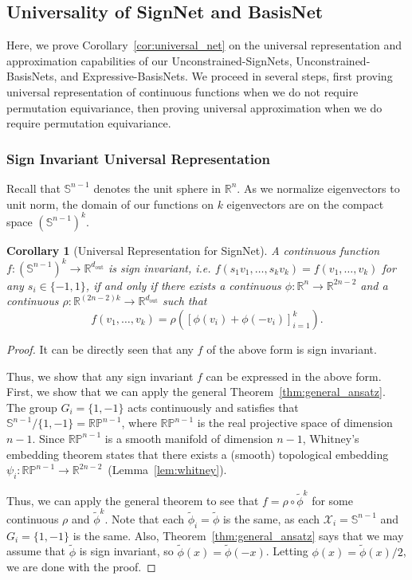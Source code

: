 \documentclass{article} \usepackage{iclr2023_conference,times}
\newcommand{\RR}{\mathbb R}
\newcommand{\PP}{\mathbb P}
\renewcommand{\SS}{\mathbb S}
\newcommand{\mc}[1]{\mathcal{#1}}
\newcommand{\mrm}[1]{\mathrm{#1}}
\newcommand{\dout}{d_{\mrm{out}}}
\newtheorem{corollary}{Corollary}
\begin{document}
\subsection{Universality of SignNet and BasisNet}\label{appdx: niversality of SignNet and BasisNet}

Here, we prove Corollary~\ref{cor:universal_net} on the universal representation and approximation capabilities of our Unconstrained-SignNets, Unconstrained-BasisNets, and Expressive-BasisNets. We proceed in several steps, first proving universal representation of continuous functions when we do not require permutation equivariance, then proving universal approximation when we do require permutation equivariance.


\subsubsection{Sign Invariant Universal Representation}

Recall that $\SS^{n-1}$ denotes the unit sphere in $\RR^n$. As we normalize eigenvectors to unit norm, the domain of our functions on $k$ eigenvectors are on the compact space $(\SS^{n-1})^k$.

\begin{corollary}[Universal Representation for SignNet]\label{thm:no_feature_sign_inv}
    A continuous function $f: (\SS^{n-1})^k \to \RR^{\dout}$ is sign invariant, i.e. $f(s_1 v_1, \ldots, s_k v_k) = f(v_1, \ldots, v_k)$ for any $s_i \in \{-1, 1\}$, if and only if there exists a continuous $\phi: \RR^n \to \RR^{2n-2}$ and a continuous $\rho: \RR^{(2n-2)k} \to \RR^{\dout}$ such that
    \begin{equation}
        f(v_1, \ldots, v_k) = \rho\left([\phi(v_i) + \phi(-v_i)]_{i=1}^k \right).
    \end{equation}
\end{corollary}
\begin{proof}
    It can be directly seen that any $f$ of the above form is sign invariant.

    Thus, we show that any sign invariant $f$ can be expressed in the above form.
    First, we show that we can apply the general Theorem~\ref{thm:general_ansatz}. The group $G_i = \{1, -1\}$ acts continuously and satisfies that $\SS^{n-1} / \{1, -1\} =  \RR\PP^{n-1}$, where $\RR\PP^{n-1}$ is the real projective space of dimension $n-1$. Since $\RR\PP^{n-1}$ is a smooth manifold of dimension $n-1$, Whitney's embedding theorem states that there exists a (smooth) topological embedding $\psi_i: \RR \PP^{n-1} \to \RR^{2n-2}$~(Lemma~\ref{lem:whitney}).

    Thus, we can apply the general theorem to see that $f = \rho \circ \tilde \phi^k$ for some continuous $\rho$ and $\tilde \phi^k$. Note that each $\tilde \phi_i = \tilde \phi$ is the same, as each $\mc X_i = \SS^{n-1}$ and $G_i = \{1, -1\}$ is the same. Also, Theorem~\ref{thm:general_ansatz} says that we may assume that $\tilde \phi$ is sign invariant, so $\tilde \phi(x) = \tilde \phi(-x)$. Letting $\phi(x) = \tilde \phi(x)/2$, we are done with the proof.
\end{proof}
\end{document}
